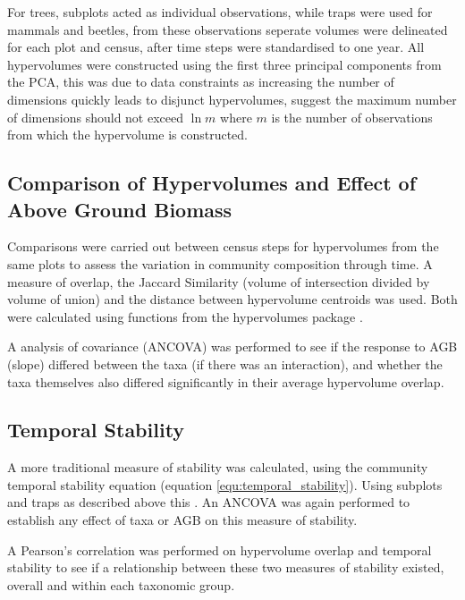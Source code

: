 	For trees, subplots acted as individual observations, while traps were used for mammals and beetles, from these observations seperate volumes were delineated for each plot and census, after time steps were standardised to one year. All hypervolumes were constructed using the first three principal components from the PCA, this was due to data constraints as increasing the number of dimensions quickly leads to disjunct hypervolumes, \cite{Blonder2017b} suggest the maximum number of dimensions should not exceed $\ln m$ where $m$ is the number of observations from which the hypervolume is constructed.

\subsection{Comparison of Hypervolumes and Effect of Above Ground Biomass}

Comparisons were carried out between census steps for hypervolumes from the same plots to assess the variation in community composition through time. A measure of overlap, the Jaccard Similarity (volume of intersection divided by volume of union) and the distance between hypervolume centroids was used. Both were calculated using functions from the hypervolumes package \citep{Blonder2017a}.

A analysis of covariance (ANCOVA) was performed to see if the response to AGB (slope) differed between the taxa (if there was an interaction), and whether the taxa themselves also differed significantly in their average hypervolume overlap.


\subsection{Temporal Stability}
A more traditional measure of stability was calculated, using the community temporal stability equation (equation \ref{equ:temporal_stability}). Using subplots and traps as described above this . An ANCOVA was again performed to  establish any effect of taxa or AGB on this measure of stability. 

A Pearson's correlation was performed on hypervolume overlap and temporal stability to see if a relationship between these two measures of stability existed, overall and within each taxonomic group. 